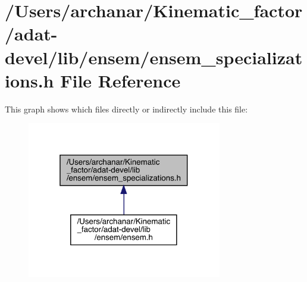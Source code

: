 \hypertarget{adat-devel_2lib_2ensem_2ensem__specializations_8h}{}\section{/\+Users/archanar/\+Kinematic\+\_\+factor/adat-\/devel/lib/ensem/ensem\+\_\+specializations.h File Reference}
\label{adat-devel_2lib_2ensem_2ensem__specializations_8h}
This graph shows which files directly or indirectly include this file\+:
\nopagebreak
\begin{figure}[H]
\begin{center}
\leavevmode
\includegraphics[width=241pt]{d3/d35/adat-devel_2lib_2ensem_2ensem__specializations_8h__dep__incl}
\end{center}
\end{figure}
